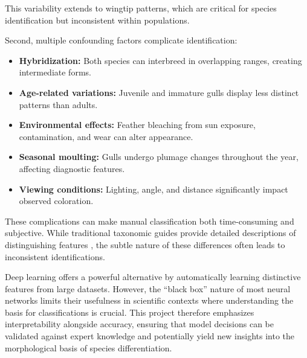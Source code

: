 This variability extends to wingtip patterns, which are critical for species identification but inconsistent within populations.

Second, multiple confounding factors complicate identification:
\begin{itemize}
    \item \textbf{Hybridization:} Both species can interbreed in overlapping ranges, creating intermediate forms.
    \item \textbf{Age-related variations:} Juvenile and immature gulls display less distinct patterns than adults.
    \item \textbf{Environmental effects:} Feather bleaching from sun exposure, contamination, and wear can alter appearance.
    \item \textbf{Seasonal moulting:} Gulls undergo plumage changes throughout the year, affecting diagnostic features.
    \item \textbf{Viewing conditions:} Lighting, angle, and distance significantly impact observed coloration.
\end{itemize}

These complications can make manual classification both time-consuming and subjective. While traditional taxonomic guides provide detailed descriptions of distinguishing features \citep{taxonomicguide2023}, the subtle nature of these differences often leads to inconsistent identifications.

Deep learning offers a powerful alternative by automatically learning distinctive features from large datasets. However, the ``black box'' nature of most neural networks limits their usefulness in scientific contexts where understanding the basis for classifications is crucial. This project therefore emphasizes interpretability alongside accuracy, ensuring that model decisions can be validated against expert knowledge and potentially yield new insights into the morphological basis of species differentiation.

